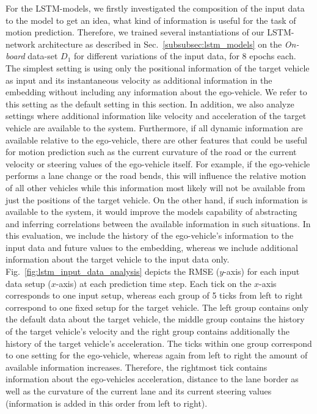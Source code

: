 For the \ac{LSTM}-models, we firstly investigated the composition of the input data to the model to get an idea, what kind of information is useful for the task of motion prediction.
Therefore, we trained several instantiations of our \ac{LSTM}-network architecture as described in Sec.~\ref{subsubsec:lstm_models} on the \emph{On-board} data-set $D_1$ for different variations of the input data, for \num{8} epochs each.
The simplest setting is using only the positional information of the target vehicle as input and its instantaneous velocity as additional information in the embedding without including any information about the ego-vehicle.
We refer to this setting as the default setting in this section.
In addition, we also analyze settings where additional information like velocity and acceleration of the target vehicle are available to the system.
Furthermore, if all dynamic information are available relative to the ego-vehicle, there are other features that could be useful for motion prediction such as the current curvature of the road or the current velocity or steering values of the ego-vehicle itself.
For example, if the ego-vehicle performs a lane change or the road bends, this will influence the relative motion of all other vehicles while this information most likely will not be available from just the positions of the target vehicle. 
On the other hand, if such information is available to the system, it would improve the models capability of abstracting and inferring correlations between the available information in such situations.
In this evaluation, we include the history of the ego-vehicle's information to the input data and future values to the embedding, whereas we include additional information about the target vehicle to the input data only. 
\\
Fig.~\ref{fig:lstm_input_data_analysis} depicts the \ac{RMSE} ($y$-axis) for each input data setup ($x$-axis) at each prediction time step.
Each tick on the $x$-axis corresponds to one input setup, whereas each group of \num{5} ticks from left to right correspond to one fixed setup for the target vehicle.
The left group contains only the default data about the target vehicle, the middle group contains the history of the target vehicle's velocity and the right group contains additionally the history of the target vehicle's acceleration.
The ticks within one group correspond to one setting for the ego-vehicle, whereas again from left to right the amount of available information increases.
Therefore, the rightmost tick contains information about the ego-vehicles acceleration, distance to the lane border as well as the curvature of the current lane and its current steering values (information is added in this order from left to right). 
